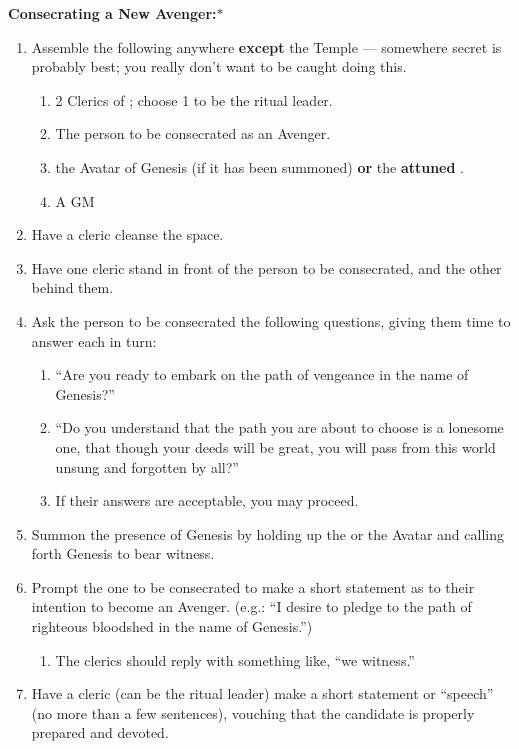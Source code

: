 \documentclass[green]{GL2020}
\begin{document}
\textbf{Consecrating a New Avenger:}$*$\\
\begin{enumerate}
  \item Assemble the following anywhere \textbf{except} the Temple — somewhere secret is probably best; you really don’t want to be caught doing this.
  \begin{enumerate}
    \item 2 Clerics of \cGenesis{}; choose 1 to be the ritual leader.
    \item The person to be consecrated as an Avenger.
    \item the Avatar of Genesis (if it has been summoned) \textbf{or} the \textbf{attuned} \iHorseshoe{}.
    \item A GM
  \end{enumerate}
  \item Have a cleric cleanse the space. 
  \item Have one cleric stand in front of the person to be consecrated, and the other behind them.
  \item Ask the person to be consecrated the following questions, giving them time to answer each in turn: 
  \begin{enumerate}
    \item ``Are you ready to embark on the path of vengeance in the name of Genesis?''
    \item ``Do you understand that the path you are about to choose is a lonesome one, that though your deeds will be great, you will pass from this world unsung and forgotten by all?''
    \item If their answers are acceptable, you may proceed.
  \end{enumerate}
  \item Summon the presence of Genesis by holding up the \iHorseshoe{} or the Avatar and calling forth Genesis to bear witness.
  \item Prompt the one to be consecrated to make a short statement as to their intention to become an Avenger. (e.g.: ``I desire to pledge to the path of righteous bloodshed in the name of Genesis.'')
  \begin{enumerate}
    \item The clerics should reply with something like, ``we witness.''
  \end{enumerate}
  \item Have a cleric (can be the ritual leader) make a short statement or “speech” (no more than a few sentences), vouching that the candidate is properly prepared and devoted.

\end{enumerate}
\end{document}
